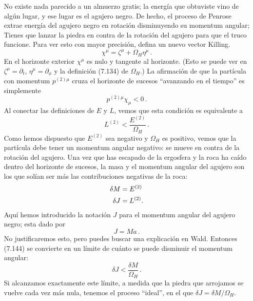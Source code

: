 \documentclass[11pt,b5paper,openany,twoside]{book}
\newcommand{\p}[1]{{\partial_{#1}}}
\begin{document}
No existe nada parecido a un almuerzo gratis; la energía que obtuviste vino de algún lugar, y ese lugar es el agujero negro.
De hecho, el proceso de Penrose extrae energía del agujero negro en rotación disminuyendo su momentum angular; Tienes que lanzar la piedra en contra de la rotación del agujero para que el truco funcione.
Para ver esto con mayor precisión, defina un nuevo vector Killing.
\begin{equation}
\chi^\mu = \zeta^\mu + \Omega_H\eta^\mu\,.\label{7.142}
\end{equation}
En el horizonte exterior $\chi^\mu$ es nulo y tangente al horizonte.
(Esto se puede ver en $\zeta^\mu = \p{t}$, $\eta^\mu=\p\phi$ y la definición (7.134) de $\Omega_H$.)
La afirmación de que la partícula con momentum $p^{(2)\mu}$ cruza el horizonte de sucesos ``avanzando en el tiempo'' es simplemente
\begin{equation}
p^{(2)\mu}\chi_\mu <0\,.\label{7.143}
\end{equation}
Al conectar las definiciones de $E$ y $L$, vemos que esta condición es equivalente a
\begin{equation}
L^{(2)} < \frac{E^{(2)}}{\Omega_H} \,.\label{7.144}
\end{equation}
Como hemos dispuesto que $E^{(2)}$ sea negativo y $\Omega_H$ es positivo, vemos que la partícula debe tener un momentum angular negativo: se mueve en contra de la rotación del agujero.
Una vez que has escapado de la ergosfera y la roca ha caído dentro del horizonte de sucesos, la masa y el momentum angular del agujero son los que solían ser más las contribuciones negativas de la roca:
\begin{align}
\delta M  &=  E^{(2)} \notag \\  \delta J  &=  L^{(2)}.
\label{7.145}
\end{align}
Aquí hemos introducido la notación $J$ para el momentum angular del agujero negro; esta dado por
\begin{equation}
J=Ma\,.\label{7.146}
\end{equation}
No justificaremos esto, pero puedes buscar una explicación en Wald.
Entonces (7.144) se convierte en un límite de cuánto se puede disminuir el momentum angular:
\begin{equation}
\delta J < \frac{\delta M}{\Omega_H}\,.
\label{7.147}
\end{equation}
Si alcanzamos exactamente este límite, a medida que la piedra que arrojamos se vuelve cada vez más nula, tenemos el proceso ``ideal'', en el que $\delta J=\delta M/\Omega_H$.
\end{document}
